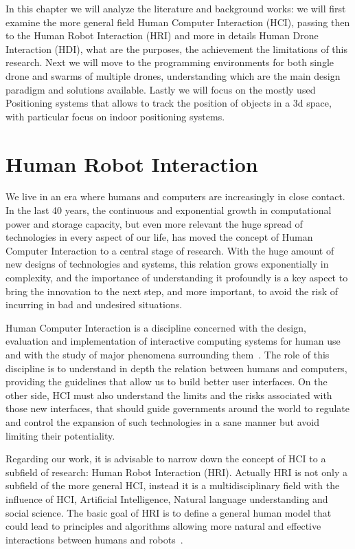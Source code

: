 In this chapter we will analyze the literature and background works: we will first examine the more general field 
Human Computer Interaction (HCI), passing then to the Human Robot Interaction (HRI) and more in details 
Human Drone Interaction (HDI), what are the purposes, the achievement the limitations of this research. 
Next we will move to the programming environments for both single drone and swarms of multiple drones, understanding 
which are the main design paradigm and solutions available. Lastly we will focus on the mostly used Positioning systems 
that allows to track the position of objects in a 3d space, with particular focus on indoor positioning systems.


\section{Human Robot Interaction}\label{sec:soa_hri}
We live in an era where humans and computers are increasingly in close contact. In the last 40 years, the continuous and exponential growth 
in computational power and storage capacity, but even more relevant the huge spread of technologies in every aspect of our life,
has moved the concept of Human Computer Interaction to a central stage of research. 
With the huge amount of new designs of technologies and systems, this relation grows exponentially in complexity, and the importance
of understanding it profoundly is a key aspect to bring the innovation to the next step, and more important, to avoid the risk of incurring in bad and undesired situations.

Human Computer Interaction is a discipline concerned with the design, evaluation and implementation of interactive
computing systems for human use and with the study of major phenomena surrounding them~\cite{sinha2010human}.
The role of this discipline is to understand in depth the relation between humans and computers, 
providing the guidelines that allow us to build better user interfaces. 
On the other side, HCI must also understand the limits and the risks associated with those new interfaces, that should guide governments around the world to regulate 
and control the expansion of such technologies in a sane manner but avoid limiting their potentiality.

Regarding our work, it is advisable to narrow down the concept of HCI to a subfield of research: Human Robot Interaction (HRI). 
Actually HRI is not only a subfield of the more general HCI, instead it is a multidisciplinary field with the influence of HCI, 
Artificial Intelligence, Natural language understanding and social science.
The basic goal of HRI is to define a general human model that could lead to principles and algorithms allowing more natural and 
effective interactions between humans and robots~\cite{hri2009davidMaya}.


